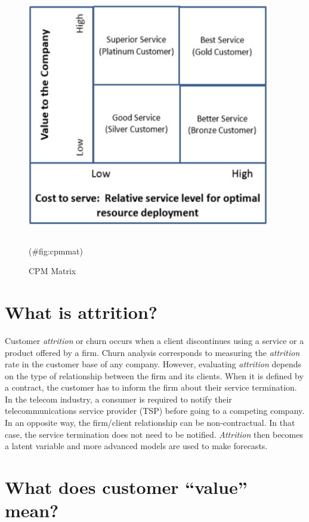 \documentclass[
]{book}
\begin{document}
\begin{figure}

{\centering \includegraphics[width=300pt,height=300pt]{./imgs/cpm_matrix} 

}

\caption{CPM Matrix}(\#fig:cpmmat)
\end{figure}

\hypertarget{what-is-attrition}{%
\section{What is attrition?}\label{what-is-attrition}}

Customer \emph{attrition} or churn occurs when a client discontinues using a service or a product offered by a firm. Churn analysis corresponds to measuring the \emph{attrition} rate in the customer base of any company. However, evaluating \emph{attrition} depends on the type of relationship between the firm and its clients. When it is defined by a contract, the customer has to inform the firm about their service termination. In the telecom industry, a consumer is required to notify their telecommunications service provider (TSP) before going to a competing company. In an opposite way, the firm/client relationship can be non-contractual. In that case, the service termination does not need to be notified. \emph{Attrition} then becomes a latent variable and more advanced models are used to make forecasts.

\hypertarget{what-does-customer-value-mean}{%
\section{What does customer ``value'' mean?}\label{what-does-customer-value-mean}}
\end{document}
